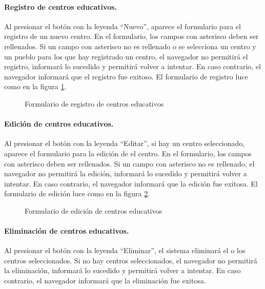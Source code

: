 \documentclass[a4paper, 9pt, conference]{article}              %
\begin{document}
\paragraph{Registro de centros educativos.}

Al presionar el bot\'on con la leyenda ``Nuevo'', aparece el formulario para el registro de un nuevo centro. En el formulario, los campos con asterisco deben ser rellenados. Si un campo con asterisco no es rellenado o se selecciona un centro y un pueblo para los que hay registrado un centro, el navegador no permitir\'a el registro, informar\'a lo sucedido y permitir\'a volver a intentar. En caso contrario, el navegador informar\'a que el registro fue exitoso. El formulario de registro luce como en la figura \ref{fig:geoschoolsnew}.

\begin{figure}
	\centering
		\caption{Formulario de registro de centros educativos}
	\label{fig:geoschoolsnew}
\end{figure}

\paragraph{Edici\'on de centros educativos.}

Al presionar el bot\'on con la leyenda ``Editar'', si hay un centro seleccionado, aparece el formulario para la edici\'on de el centro. En el formulario, los campos con asterisco deben ser rellenados. Si un campo con asterisco no es rellenado, el navegador no permitir\'a la edici\'on, informar\'a lo sucedido y permitir\'a volver a intentar. En caso contrario, el navegador informar\'a que la edici\'on fue exitosa. El formulario de edici\'on luce como en la figura \ref{fig:geoschoolsedit}.

\begin{figure}
	\centering
		\caption{Formulario de edici\'on de centros educativos}
	\label{fig:geoschoolsedit}
\end{figure}

\paragraph{Eliminaci\'on de centros educativos.}

Al presionar el bot\'on con la leyenda ``Eliminar'', el sistema eliminar\'a el o los centros seleccionados. Si no hay centros seleccionados, el navegador no permitir\'a la eliminaci\'on, informar\'a lo sucedido y permitir\'a volver a intentar. En caso contrario, el navegador informar\'a que la eliminaci\'on fue exitosa.
\end{document}
